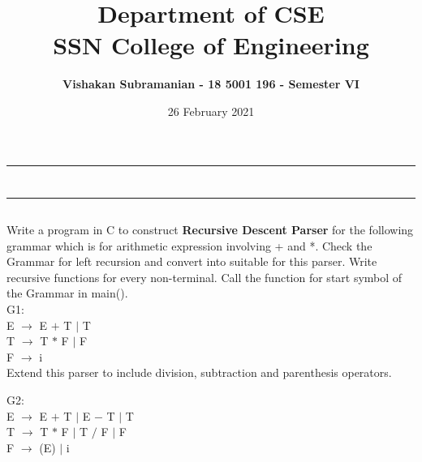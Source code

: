 \documentclass[12pt, a4]{article}
\title{\textbf{Department of CSE\\SSN College of Engineering}}
\author{\textbf{Vishakan Subramanian - 18 5001 196 - Semester VI}}
\date{26 February 2021}
\begin{document}
\maketitle
\hrule
\section*{}
\hrule
\bigskip

\subsection*{}
\subsection*{}
\begin{flushleft}
Write a program in C to construct \textbf{Recursive Descent Parser} for the following grammar which is for arithmetic expression involving + and *. Check the Grammar for left recursion and convert into suitable for this parser. Write recursive functions for every non-terminal. Call the function for start symbol of the Grammar in main().
\\
G1: \\
\hspace{10mm} E $\rightarrow$ E $+$ T $|$ T \\
\hspace{10mm} T $\rightarrow$ T $*$ F $|$ F \\
\hspace{10mm} F $\rightarrow$ i \\

Extend this parser to include division, subtraction and parenthesis operators.

G2: \\
\hspace{10mm} E $\rightarrow$ E $+$ T $|$ E $-$ T $|$ T \\
\hspace{10mm} T $\rightarrow$ T $*$ F $|$ T $/$ F $|$ F \\
\hspace{10mm} F $\rightarrow$ (E) $|$ i \\
\end{flushleft}

\newpage
\subsection*{}
\begin{flushleft}

\end{flushleft}
\end{document}
